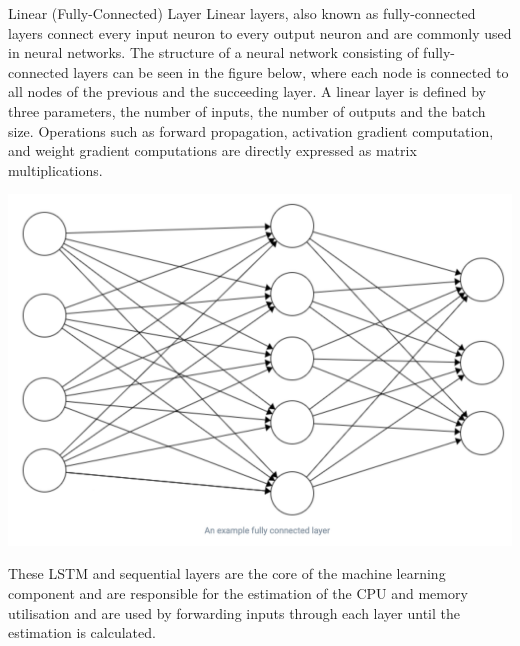  \begin{pabox}{Linear (Fully-Connected) Layer}
    \label{def:linear-layer-definition}
    Linear layers, also known as fully-connected layers connect every input neuron to every output neuron and are commonly used in neural networks. The structure of a neural network consisting of fully-connected layers can be seen in the figure below, where each node is connected to all nodes of the previous and the succeeding layer.
    A linear layer is defined by three parameters, the number of inputs, the number of outputs and the batch size.
    Operations such as forward propagation, activation gradient computation, and weight gradient computations are directly expressed as matrix multiplications.
    \begin{minipage}[t]{1\linewidth}
      \centering
      \vspace*{0pt}
          \includegraphics[height=0.25\textheight,width=0.5\linewidth]{figures/fc_layer.png}
          \label{fig:fully-connected-layers-architecture}
      \end{minipage}
  \end{pabox}
  These LSTM and sequential layers are the core of the machine learning component and are responsible for the estimation of the CPU and memory utilisation and are used by forwarding inputs through each layer until the estimation is calculated.

   
  
  


